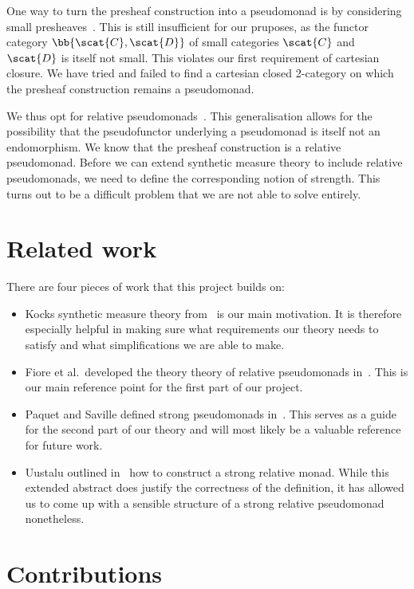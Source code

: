 One way to turn the presheaf construction into a pseudomonad is by considering
small presheaves~\cite{day2007}. This is still insufficient for our pruposes,
as the functor category $\bb{\scat{C},\scat{D}}$ of small categories $\scat{C}$
and $\scat{D}$ is itself not small. This violates our first requirement of
cartesian closure. We have tried and failed to find a cartesian closed
2-category on which the presheaf construction remains a pseudomonad.

We thus opt for relative pseudomonads~\cite{fiore2017}. This generalisation
allows for the possibility that the pseudofunctor underlying a pseudomonad is
itself not an endomorphism. We know that the presheaf construction is a
relative pseudomonad. Before we can extend synthetic measure theory to include
relative pseudomonads, we need to define the corresponding notion of strength.
This turns out to be a difficult problem that we are not able to solve
entirely.

\section{Related work}

There are four pieces of work that this project builds on:

\begin{itemize}
  \item Kocks synthetic measure theory from~\cite{kock2011} is our main motivation. It
    is therefore especially helpful in making sure what requirements our theory needs
    to satisfy and what simplifications we are able to make.
  \item Fiore et al.~developed the theory theory of relative pseudomonads in~\cite{fiore2017}.
    This is our main reference point for the first part of our project.
  \item  Paquet and Saville defined strong pseudomonads in~\cite{saville2023}. This
    serves as a guide for the second part of our theory and will most likely be a
    valuable reference for future work.
  \item Uustalu outlined in~\cite{tarmo} how to construct a strong relative monad. While
    this extended abstract does justify the correctness of the definition, it has allowed
    us to come up with a sensible structure of a strong relative pseudomonad nonetheless.
\end{itemize}

\section{Contributions}

